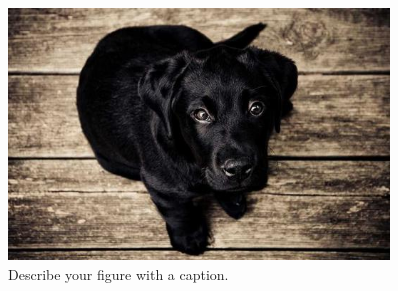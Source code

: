 \begin{figure}[htbp]
  \centering
  \includegraphics[width=0.9\textwidth]{assets/dog.jpg}
  \caption{Describe your figure with a caption.}
  \label{fig:dog} %
\end{figure}
